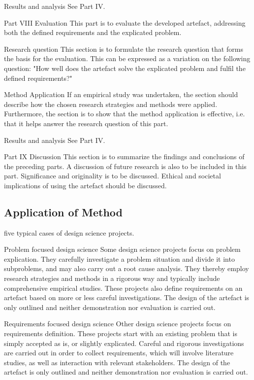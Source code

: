 {Results and analysis
See Part IV.

Part VIII Evaluation
This part is to evaluate the developed artefact, addressing both the
defined requirements and the explicated problem.

Research question
This section is to formulate the research question that forms the
basis for the evaluation. This can be expressed as a variation on the
following question: "How well does the artefact solve the explicated
problem and fulfil the defined requirements?"

Method Application
If an empirical study was undertaken, the section should describe
how the chosen research strategies and methods were applied. Furthermore,
the section is to show that the method application is effective,
i.e. that it helps answer the research question of this part.

Results and analysis
See Part IV.

Part IX Discussion
This section is to summarize the findings and conclusions of the preceding
parts. A discussion of future research is also to be included in
this part. Significance and originality is to be discussed. Ethical and
societal implications of using the artefact should be discussed.


\subsection{Application of Method}


five typical cases of design science projects.

Problem focused design science
Some design science projects focus on problem explication. They
carefully investigate a problem situation and divide it into subproblems,
and may also carry out a root cause analysis. They thereby
employ research strategies and methods in a rigorous way and typically
include comprehensive empirical studies. These projects also
define requirements on an artefact based on more or less careful
investigations. The design of the artefact is only outlined and neither
demonstration nor evaluation is carried out.

Requirements focused design science
Other design science projects focus on requirements definition.
These projects start with an existing problem that is simply accepted
as is, or slightly explicated. Careful and rigorous investigations are
carried out in order to collect requirements, which will involve literature
studies, as well as interaction with relevant stakeholders. The
design of the artefact is only outlined and neither demonstration nor
evaluation is carried out.

}
